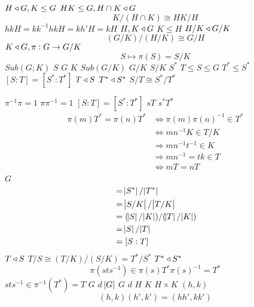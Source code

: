 \documentclass{article}
\begin{document}
$H\triangleleft G, K\le G$
$HK\le G,H\cap K\triangleleft G$
\begin{equation*}
   K/(H\cap K)\cong HK/H
   \end{equation*}
$hkH=kk^{-1}hkH=kh'H=kH$
$H,K\triangleleft G$
$K\le H$
$H/K\triangleleft G/K$
\begin{equation*}
   (G/K)/(H/K)\cong G/H
   \end{equation*}
$K\triangleleft G, \pi:G\to G/K$
\begin{equation*}
   S\mapsto \pi(S)=S/K
   \end{equation*}
$Sub(G;K)$
$S$
$G$
$K$
$Sub(G/K)$
$G/K$
$S/K$
$S^*$
$T\le S\le G$
$T^*\le S^*$
$[S:T]=[S^*:T^*]$
$T\triangleleft S$
$T^*\triangleleft S^*$
$S/T\cong S^*/T^*$
\begin{center}
   \end{center}
$\pi^{-1}\pi=1$
$\pi\pi^{-1}=1$
$[S:T]=[S^*:T^*]$
$sT$
$s^*T^*$
\begin{align*}
   \pi(m)T^*=\pi(n)T^*&\Leftrightarrow \pi(m)\pi(n)^{-1}\in T^*\\
   &\Leftrightarrow mn^{-1}K\in T/K\\
   &\Rightarrow mn^{-1}t^{-1}\in K\\
   &\Rightarrow mn^{-1}=tk\in T\\
   &\Leftrightarrow mT=nT\\
   \end{align*}
$G$
\begin{align*}
   [S^*:T^*]&=\abs{S^*}/\abs{T^*}\\
   &=\abs{S/K}/\abs{T/K}\\
   &=(\abs{S}/\abs{K})/(\abs{T}/\abs{K})\\
   &=\abs{S}/\abs{T}\\
   &=[S:T]
   \end{align*}
$T\triangleleft S$
$T/S\cong (T/K)/(S/K)=T^*/S^*$
$T^*\triangleleft S^*$
\begin{equation*}
   \pi(sts^{-1})\in \pi(s)T^*\pi(s)^{-1}=T^*
   \end{equation*}
$sts^{-1}\in \pi^{-1}(T^*)=T$
$G$
$d$
$\abs{G}$
$G$
$d$
$H$
$K$
$H\times
   K$
$(h,k)$
\begin{equation*}
   (h,k)(h',k')=(hh',kk')
   \end{equation*}
\end{document}
